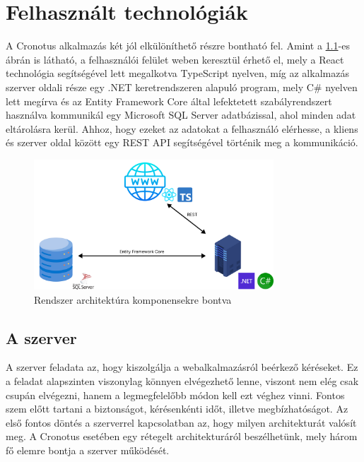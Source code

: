\lstset{style=c_sharp}

\chapter{Felhasznált technológiák}


A Cronotus alkalmazás két jól elkülöníthető részre bontható fel. Amint a \ref{fig:architecture_overview}-es ábrán is látható, a felhasználói felület weben keresztül érhető el, mely a React\cite{reactdocs} technológia segítségével lett megalkotva TypeScript\cite{typescriptdocs} nyelven, míg az alkalmazás szerver oldali része egy .NET keretrendszeren\cite{dotnetnocs} alapuló program, mely C\# nyelven\cite{csharpdocs} lett megírva és az Entity Framework Core\cite{entityframeworkdocs} által lefektetett szabályrendszert használva kommunikál egy Microsoft SQL Server\cite{sqlserverdocs} adatbázissal, ahol minden adat eltárolásra kerül.
Ahhoz, hogy ezeket az adatokat a felhasználó elérhesse, a kliens és szerver oldal között egy REST API\cite{restfuldocs} segítségével történik meg a kommunikáció.

\begin{figure}[h]
    \centering
    \includegraphics[width=0.8\textwidth]{./images/cronotus_architecture_overview.png}
    \caption{Rendszer architektúra komponensekre bontva}
    \label{fig:architecture_overview}
\end{figure}


\section{A szerver}

A szerver feladata az, hogy kiszolgálja a webalkalmazásról beérkező kéréseket. Ez a feladat alapszinten viszonylag könnyen elvégezhető lenne, viszont nem elég csak csupán elvégezni, hanem a legmegfelelőbb módon kell ezt véghez vinni. Fontos szem előtt tartani a biztonságot, kérésenkénti időt, illetve megbízhatóságot. Az első fontos döntés a szerverrel kapcsolatban az, hogy milyen architekturát valósít meg. A Cronotus esetében egy rétegelt architekturáról\cite{onionarchitecturedocs} beszélhetünk, mely három fő elemre bontja a szerver működését.

